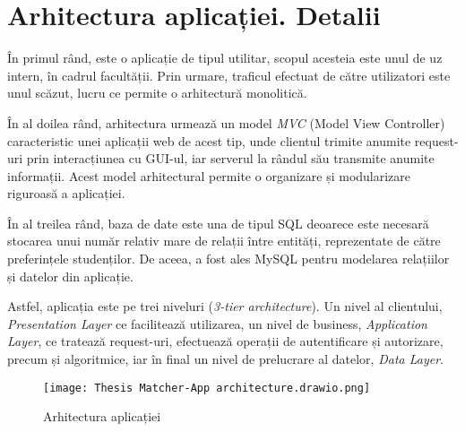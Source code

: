 \chapter{Arhitectura aplicației. Detalii}
În primul rând, \textbf{\thesistitle} este o aplicație de tipul utilitar, scopul acesteia este unul de uz intern, în cadrul facultății. Prin urmare, traficul efectuat de către utilizatori este unul scăzut, lucru ce permite o arhitectură monolitică.

În al doilea rând, arhitectura urmează un model \textit{MVC} (Model View Controller) caracteristic unei aplicații web de acest tip, unde clientul trimite anumite request-uri prin interacțiunea cu GUI-ul, iar serverul la rândul său transmite anumite informații. Acest model arhitectural permite o organizare și modularizare riguroasă a aplicației.

În al treilea rând, baza de date este una de tipul SQL deoarece este necesară stocarea unui număr relativ mare de relații între entități, reprezentate de către preferințele studenților. De aceea, a fost ales MySQL pentru modelarea relațiilor și datelor din aplicație.

Astfel, aplicația este pe trei niveluri (\textit{3-tier architecture}). Un nivel al clientului, \textit{Presentation Layer} ce facilitează utilizarea, un nivel de business, \textit{Application Layer}, ce tratează request-uri, efectuează operații de autentificare și autorizare, precum și algoritmice, iar în final un nivel de prelucrare al datelor, \textit{Data Layer}.

\begin{figure}[H]
	\centering
	\texttt{[image: Thesis Matcher-App architecture.drawio.png]}
	\caption{Arhitectura aplicației}
\end{figure}